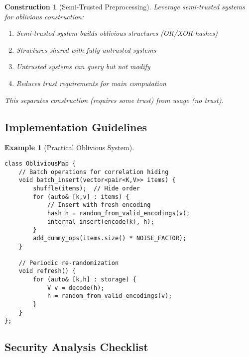 \documentclass[11pt,final,hidelinks]{article}
\newtheorem{example}[theorem]{Example}
\newtheorem{construction}[theorem]{Construction}
\begin{document}
\begin{construction}[Semi-Trusted Preprocessing]
Leverage semi-trusted systems for oblivious construction:
\begin{enumerate}
    \item Semi-trusted system builds oblivious structures (OR/XOR hashes)
    \item Structures shared with fully untrusted systems
    \item Untrusted systems can query but not modify
    \item Reduces trust requirements for main computation
\end{enumerate}
This separates construction (requires some trust) from usage (no trust).
\end{construction}

\subsection{Implementation Guidelines}

\begin{example}[Practical Oblivious System]
\begin{verbatim}
class ObliviousMap {
    // Batch operations for correlation hiding
    void batch_insert(vector<pair<K,V>> items) {
        shuffle(items);  // Hide order
        for (auto& [k,v] : items) {
            // Insert with fresh encoding
            hash h = random_from_valid_encodings(v);
            internal_insert(encode(k), h);
        }
        add_dummy_ops(items.size() * NOISE_FACTOR);
    }
    
    // Periodic re-randomization
    void refresh() {
        for (auto& [k,h] : storage) {
            V v = decode(h);
            h = random_from_valid_encodings(v);
        }
    }
};
\end{verbatim}
\end{example}

\subsection{Security Analysis Checklist}
\end{document}
